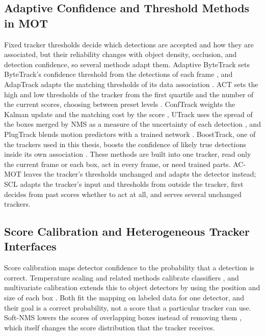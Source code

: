 \subsection{Adaptive Confidence and Threshold Methods in MOT}\label{sec:rw-thresholds}
Fixed tracker thresholds decide which detections are accepted and how they are associated, but their reliability changes with object density, occlusion, and detection confidence, so several methods adapt them. Adaptive ByteTrack sets ByteTrack's confidence threshold from the detections of each frame \cite{ma2023adaptivebytetrack}, and AdapTrack adapts the matching thresholds of its data association \cite{shim2024adaptrack}. ACT sets the high and low thresholds of the tracker from the first quartile and the number of the current scores, choosing between preset levels \cite{act2026adaptive}. ConfTrack weights the Kalman update and the matching cost by the score \cite{jung2024conftrack}, UTrack uses the spread of the boxes merged by NMS as a measure of the uncertainty of each detection \cite{solano2025utrack}, and PlugTrack blends motion predictors with a trained network \cite{kim2026plugtrack}. BoostTrack, one of the trackers used in this thesis, boosts the confidence of likely true detections inside its own association \cite{stanojevic2024boosttrack}. These methods are built into one tracker, read only the current frame or each box, act in every frame, or need trained parts. AC-MOT leaves the tracker's thresholds unchanged and adapts the detector instead; SCL adapts the tracker's input and thresholds from outside the tracker, first decides from past scores whether to act at all, and serves several unchanged trackers.

\subsection{Score Calibration and Heterogeneous Tracker Interfaces}\label{sec:rw-calibration}
Score calibration maps detector confidence to the probability that a detection is correct. Temperature scaling and related methods calibrate classifiers \cite{guo2017calibration}, and multivariate calibration extends this to object detectors by using the position and size of each box \cite{kuppers2020detcalib}. Both fit the mapping on labeled data for one detector, and their goal is a correct probability, not a score that a particular tracker can use. Soft-NMS lowers the scores of overlapping boxes instead of removing them \cite{bodla2017softnms}, which itself changes the score distribution that the tracker receives.

